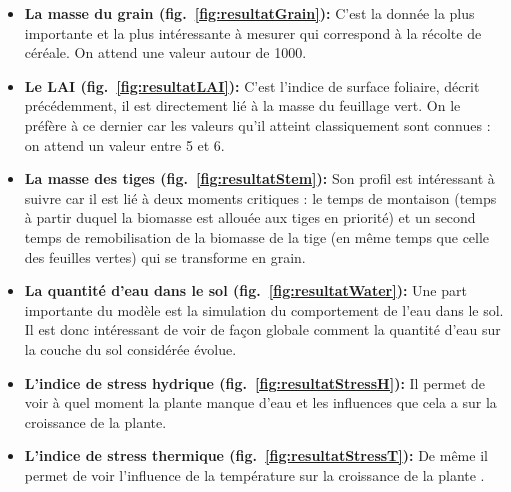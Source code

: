 \begin{itemize}

	\item \textbf{La masse du grain (fig.~\ref{fig:resultatGrain}):} C'est la donnée la plus importante et la plus intéressante à mesurer qui correspond à la récolte de céréale. On attend une valeur autour de 1000.
	
	\item \textbf{Le LAI (fig.~\ref{fig:resultatLAI}):} C'est l'indice de surface foliaire, décrit précédemment, il est directement lié à la masse du feuillage vert. On le préfère à ce dernier car les valeurs qu'il atteint classiquement sont connues : on attend un valeur entre 5 et 6.
	
	\item \textbf{La masse des tiges (fig.~\ref{fig:resultatStem}):} Son profil est intéressant à suivre car il est lié à deux moments critiques : le temps de montaison (temps à partir duquel la biomasse est allouée aux tiges en priorité) et un second temps de remobilisation de la biomasse de la tige (en même temps que celle des feuilles vertes) qui se transforme en grain.
	
	\item \textbf{La quantité d'eau dans le sol (fig.~\ref{fig:resultatWater}):} Une part importante du modèle est la simulation du comportement de l'eau dans le sol. Il est donc intéressant de voir de façon globale comment la quantité d'eau sur la couche du sol considérée évolue.
	
	\item \textbf{L'indice de stress hydrique (fig.~\ref{fig:resultatStressH}):} Il permet de voir à quel moment la plante manque d'eau et les influences que cela a sur la croissance de la plante.
	
	\item \textbf{L'indice de stress thermique (fig.~\ref{fig:resultatStressT}):} De même il permet de voir l'influence de la température sur la croissance de la plante .

\end{itemize}

